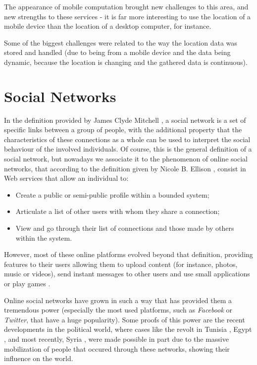 The appearance of mobile computation brought new challenges to this area, and new strengths to these services - it is far more interesting to use the location of a mobile device than the location of a desktop computer, for instance.

Some of the biggest challenges were related to the way the location data was stored and handled (due to being from a mobile device and the data being dynamic, because the location is changing and the gathered data is continuous).

\section{Social Networks}\label{sec:sn}

In the definition provided by James Clyde Mitchell \cite{kn:Mit69}, a social network is a set of specific links between a group of people, with the additional property that the characteristics of these connections as a whole can be used to interpret the social behaviour of the involved individuals. 
Of course, this is the general definition of a social network, but nowadays we associate it to the phenomenon of online social networks, that according to the definition given by Nicole B. Ellison \cite{kn:BE08}, consist in Web services that allow an individual to:

\begin{itemize}
\item Create a public or semi-public profile within a bounded system;
\item Articulate a list of other users with whom they share a connection;
\item View and go through their list of connections and those made by others within the system.
\end{itemize}

However, most of these online platforms evolved beyond that definition, providing features to their users allowing them to upload content (for instance, photos, music or videos), send instant messages to other users and use small applications or play games \cite{kn:Joi08}.

Online social networks have grown in such a way that has provided them a tremendous power (especially the most used platforms, such as \emph{Facebook} or \emph{Twitter}, that have a huge popularity). 
Some proofs of this power are the recent developments in the political world, where cases like the revolt in Tunisia \cite{kn:Del11}, Egypt \cite{kn:Sut11}, and most recently, Syria \cite{kn:OPG+14}, were made possible in part due to the massive mobilization of people that occured through these networks, showing their influence on the world.

